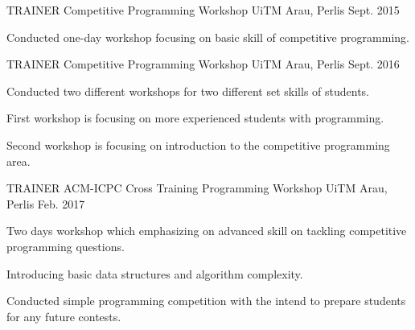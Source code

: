 

\begin{cventries}

  \cventry
    {TRAINER}
    {Competitive Programming Workshop}
    {UiTM Arau, Perlis}
    {Sept. 2015}
    {
      \begin{cvitems}
        \item {Conducted one-day workshop focusing on basic skill of competitive programming.}
      \end{cvitems}
    }
    
  \cventry
    {TRAINER}
    {Competitive Programming Workshop}
    {UiTM Arau, Perlis}
    {Sept. 2016}
    {
      \begin{cvitems}
        \item {Conducted two different workshops for two different set skills of students.}
        \item {First workshop is focusing on more experienced students with programming.}
        \item {Second workshop is focusing on introduction to the competitive programming area.}
      \end{cvitems}
    }

  \cventry
    {TRAINER}
    {ACM-ICPC Cross Training Programming Workshop}
    {UiTM Arau, Perlis}
    {Feb. 2017}
    {
      \begin{cvitems}
        \item {Two days workshop which emphasizing on advanced skill on tackling competitive programming questions.}
        \item {Introducing basic data structures and algorithm complexity.}
        \item {Conducted simple programming competition with the intend to prepare students for any future contests.}
      \end{cvitems}
    }

\end{cventries}
